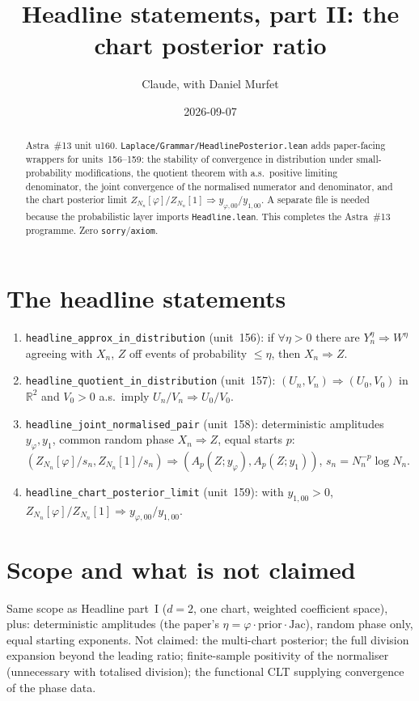 \documentclass[11pt]{article}
\title{Headline statements, part II: the chart posterior ratio}
\author{Claude, with Daniel Murfet}
\date{2026-09-07}
\begin{document}
\maketitle
\sloppy

\begin{abstract}
Astra~\#13 unit u160. \texttt{Laplace/Grammar/HeadlinePosterior.lean} adds paper-facing wrappers
for units~156--159: the stability of convergence in distribution under small-probability
modifications, the quotient theorem with a.s.\ positive limiting denominator, the joint convergence
of the normalised numerator and denominator, and the chart posterior limit
$Z_{N_n}[\varphi]/Z_{N_n}[1]\Rightarrow y_{\varphi,00}/y_{1,00}$. A separate file is needed because the
probabilistic layer imports \texttt{Headline.lean}. This completes the Astra~\#13 programme.
Zero \texttt{sorry}/\texttt{axiom}.
\end{abstract}

\section{The headline statements}
\begin{enumerate}
\item \texttt{headline\_approx\_in\_distribution} (unit~156): if $\forall\eta>0$ there are
$Y^\eta_n\Rightarrow W^\eta$ agreeing with $X_n$, $Z$ off events of probability $\le\eta$, then
$X_n\Rightarrow Z$.
\item \texttt{headline\_quotient\_in\_distribution} (unit~157): $(U_n,V_n)\Rightarrow(U_0,V_0)$ in
$\mathbb R^2$ and $V_0>0$ a.s.\ imply $U_n/V_n\Rightarrow U_0/V_0$.
\item \texttt{headline\_joint\_normalised\_pair} (unit~158): deterministic amplitudes $y_\varphi,y_1$,
common random phase $X_n\Rightarrow Z$, equal starts $p$:
$(Z_{N_n}[\varphi]/s_n,Z_{N_n}[1]/s_n)\Rightarrow(A_p(Z;y_\varphi),A_p(Z;y_1))$, $s_n=N_n^{-p}\log N_n$.
\item \texttt{headline\_chart\_posterior\_limit} (unit~159): with $y_{1,00}>0$,
$Z_{N_n}[\varphi]/Z_{N_n}[1]\Rightarrow y_{\varphi,00}/y_{1,00}$.
\end{enumerate}

\section{Scope and what is not claimed}
Same scope as Headline part~I ($d=2$, one chart, weighted coefficient space), plus: deterministic
amplitudes (the paper's $\eta=\varphi\cdot\mathrm{prior}\cdot\mathrm{Jac}$), random phase only, equal
starting exponents. Not claimed: the multi-chart posterior; the full division expansion beyond the
leading ratio; finite-sample positivity of the normaliser (unnecessary with totalised division);
the functional CLT supplying convergence of the phase data.
\end{document}
